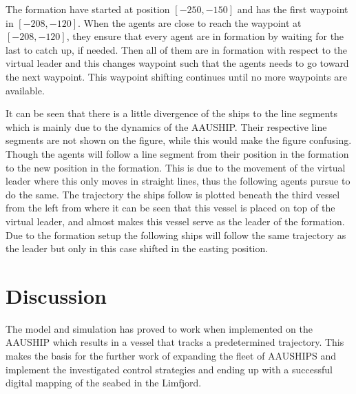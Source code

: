 \documentclass[a4paper,conference]{IEEEtran}
\begin{document}
The formation have started at position $[-250,-150]$ and has the first waypoint in $[-208,-120]$. When the agents are close to reach the waypoint at $[-208,-120]$, they ensure that every agent are in formation by waiting for the last to catch up, if needed. Then all of them are in formation with respect to the virtual leader and this changes waypoint such that the agents needs to go toward the next waypoint. This waypoint shifting continues until no more waypoints are available.

It can be seen that there is a little divergence of the ships to the line segments which is mainly due to the dynamics of the AAUSHIP. Their respective line segments are not shown on the figure, while this would make the figure confusing. Though the agents will follow a line segment from their position in the formation to the new position in the formation. This is due to the movement of the virtual leader where this only moves in straight lines, thus the following agents pursue to do the same. The trajectory the ships follow is plotted beneath the third vessel from the left from where it can be seen that this vessel is placed on top of the virtual leader, and almost makes this vessel serve as the leader of the formation. Due to the formation setup the following ships will follow the same trajectory as the leader but only in this case shifted in the easting position.

\section{Discussion}

The model and simulation has proved to work when implemented on the AAUSHIP which results in a vessel that tracks a predetermined trajectory. This makes the basis for the further work of expanding the fleet of AAUSHIPS and implement the investigated control strategies and ending up with a successful digital mapping of the seabed in the Limfjord.


 

\end{document}
